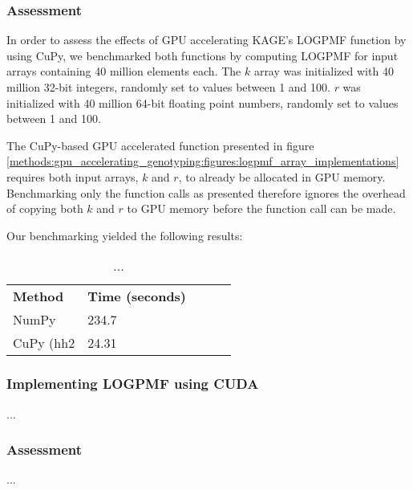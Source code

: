 \subsubsection{Assessment}
In order to assess the effects of GPU accelerating KAGE's LOGPMF function by using CuPy, we benchmarked both functions by computing LOGPMF for input arrays containing 40 million elements each.
The $k$ array was initialized with 40 million 32-bit integers, randomly set to values between 1 and 100.
$r$ was initialized with 40 million 64-bit floating point numbers, randomly set to values between 1 and 100.

The CuPy-based GPU accelerated function presented in figure \ref{methods:gpu_accelerating_genotyping:figures:logpmf_array_implementations} requires both input arrays, $k$ and $r$, to already be allocated in GPU memory.
Benchmarking only the function calls as presented therefore ignores the overhead of copying both $k$ and $r$ to GPU memory before the function call can be made.

Our benchmarking yielded the following results:
\begin{table}[H]
\begin{center}
\begin{tabular}{lllll}
\multicolumn{1}{l|}{\textbf{Method}} & \multicolumn{1}{l}{\textbf{Time (seconds)}} &  \\ \cline{1-2}
\multicolumn{1}{l|}{NumPy} & \multicolumn{1}{l}{234.7} &  \\
\multicolumn{1}{l|}{CuPy (hh2} & \multicolumn{1}{l}{24.31}
\end{tabular}
\end{center}
\caption{
  ...
}
\label{methods:gpu_accelerating_genotyping:tables:logpmf_benchmark}
\end{table}

\subsubsection{Implementing LOGPMF using CUDA}
...

\subsubsection{Assessment}
...
